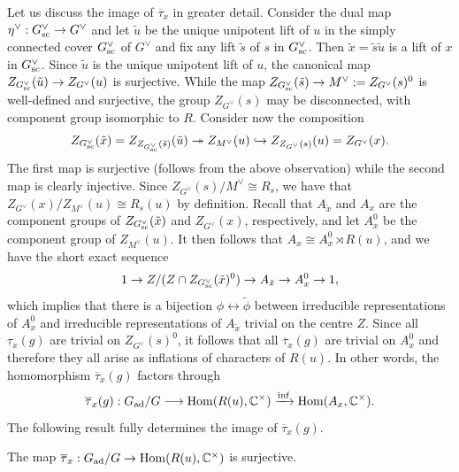 \newpage

\iffalse
Let us discuss the image of $\overline{\tau}_x$ in greater detail. Consider the dual map $\eta^\vee:G^\vee_{\mathrm{sc}}\rightarrow G^\vee$ and let $\tilde{u}$ be the unique unipotent lift of $u$ in the simply connected cover $G_{\mathrm{sc}}^\vee$ of $G^\vee$ and fix any lift $\tilde{s}$ of $s$ in $G_{\mathrm{sc}}^\vee$. Then $\tilde{x}=\tilde{s}\tilde{u}$ is a lift of $x$ in $G_{\mathrm{sc}}^\vee$. Since $\tilde{u}$ is the unique unipotent lift of $u$, the canonical map $Z_{G_{\mathrm{sc}}^\vee}(\tilde{u})\rightarrow Z_{G^\vee}(u)$ is surjective. While the map $Z_{G_{\mathrm{sc}}^\vee}(\tilde{s})\rightarrow M^\vee:=Z_{G^\vee}(s)^0$ is well-defined and surjective, the group $Z_{G^\vee}(s)$ may be disconnected, with component group isomorphic to $R$. Consider now the composition
$$Z_{G_{\mathrm{sc}}^\vee}(\tilde{x})=Z_{Z_{G_{\mathrm{sc}}^\vee}(\tilde{s})}(\tilde{u})\twoheadrightarrow Z_{M^\vee}(u)\hookrightarrow Z_{Z_{G^\vee}(s)}(u)=Z_{G^\vee}(x).$$
The first map is surjective (follows from the above observation) while the second map is clearly injective.
Since $Z_{G^\vee}(s)/M^\vee\cong R_s$, we have that $Z_{G^\vee}(x)/Z_{M^\vee}(u)\cong R_s(u)$ by definition. Recall that $A_{\tilde{x}}$ and $A_x$ are the component groups of $Z_{G_{\mathrm{sc}}^\vee}(\tilde{x})$ and $Z_{G^\vee}(x)$, respectively, and let $A_x^0$ be the component group of $Z_{M^\vee}(u)$. It then follows that $A_x\cong A_x^0\rtimes R(u)$, and we have the short exact sequence 
\begin{equation}\label{eqn:SES_comp}
    1\rightarrow Z/(Z\cap Z_{G_{\mathrm{sc}}^\vee}(\tilde{x})^0)\rightarrow A_{\tilde{x}}\rightarrow A_x^0\rightarrow 1,
\end{equation}
which implies that there is a bijection $\phi\leftrightarrow\tilde{\phi}$ between irreducible representations of $A_x^0$ and irreducible representations of $A_{\tilde{x}}$ trivial on the centre $Z$. Since all $\tau_x(g)$ are trivial on $Z_{G^\vee}(s)^0$, it follows that all $\overline{\tau}_x(g)$ are trivial on $A_x^0$ and therefore they all arise as inflations of characters of $R(u)$. In other words, the homomorphism $\overline{\tau}_x(g)$ factors through  
$$\overline{\tau}_x(g):G_{\mathrm{ad}}/G\longrightarrow\mathrm{Hom}(R(u),\mathbb{C}^\times)\xrightarrow{\mathrm{inf}}\mathrm{Hom}(A_x,\mathbb{C}^\times).$$
The following result fully determines the image of $\overline{\tau}_x(g)$.
\begin{lemma}
    The map $\overline{\tau}_x:G_{\mathrm{ad}}/G\rightarrow\mathrm{Hom}(R(u),\mathbb{C}^\times)$ is surjective. 
\end{lemma}
